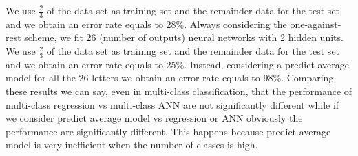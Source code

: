 We use $\frac{2}{3}$ of the data set as training set and the remainder data for the test set and we obtain an error rate equals to 28\%.
Always considering the one-against-rest scheme, we fit 26 (number of outputs) neural networks with 2 hidden units. We use $\frac{2}{3}$ of the data set as training set and the remainder data for the test set and we obtain an error rate equals to 25\%.
Instead, considering a predict average model for all the 26 letters we obtain an error rate equals to 98\%. 
Comparing these results we can say, even in multi-class classification, that the performance of multi-class regression vs multi-class ANN are not significantly different while if we consider predict average model vs regression or ANN obviously the performance are significantly different. This happens because predict average model is very inefficient when the number of classes is high.
